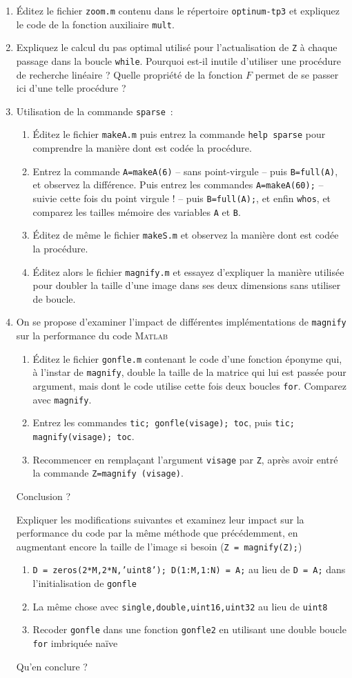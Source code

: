 \documentclass[10pt,a4paper,fleqn]{report}
\newcommand{\matlab}{\textsc{Matlab}}
\newcommand{\onit}{\begin{enumerate}}
\newcommand{\offit}{\end{enumerate}}
\renewcommand{\tt}{\texttt}
\begin{document}
\onit
\item \'Editez le fichier \tt{zoom.m} contenu dans le répertoire \tt{optinum-tp3} et expliquez le code de la fonction auxiliaire \tt{mult}.
\item Expliquez le calcul du pas optimal utilisé pour l'actualisation de \tt Z à chaque passage dans la boucle \tt{while}. Pourquoi est-il inutile d'utiliser une procédure de recherche linéaire ? Quelle propriété de la fonction $F$ permet de se passer ici d'une telle procédure ?
\item Utilisation de la commande \tt{sparse}~:
\onit
\item \'Editez le fichier \tt{makeA.m} puis entrez la commande \tt{help sparse} pour comprendre la manière dont est codée la procédure.
\item Entrez la commande \tt{A=makeA(6)} -- sans point-virgule -- puis \tt{B=full(A)}, et observez la différence. Puis entrez les commandes \tt{A=makeA(60);} -- suivie cette fois du point virgule ! -- puis \tt{B=full(A);}, et enfin \tt{whos}, et comparez les tailles mémoire des variables \tt A et \tt B.
\item \'Editez de même le fichier \tt{makeS.m} et observez la manière dont est codée la procédure.
\item \'Editez alors le fichier \tt{magnify.m} et essayez d'expliquer la manière utilisée pour doubler la taille d'une image dans ses deux dimensions sans utiliser de boucle.
\offit
\item On se propose d'examiner l'impact de différentes implémentations
  de \tt{magnify} sur la performance du code \matlab
\onit
\item \'Editez le fichier \tt{gonfle.m} contenant le code d'une fonction éponyme qui, à l'instar de \tt{magnify}, double la taille de la matrice qui lui est passée pour argument, mais dont le code utilise cette fois deux boucles \tt{for}. Comparez avec \tt{magnify}.
\item Entrez les commandes \tt{tic; gonfle(visage); toc}, puis \tt{tic; magnify(visage); toc}.
\item Recommencer en remplaçant l'argument \tt{visage} par \tt{Z}, après avoir entré la commande \tt{Z=magnify (visage)}.
\offit
Conclusion ?

Expliquer les modifications suivantes et examinez leur impact sur la
performance du code par la même méthode que précédemment, en
augmentant encore la taille de l'image si besoin (\tt{Z = magnify(Z);})
\onit
\item \tt{D = zeros(2*M,2*N,'uint8'); D(1:M,1:N) = A;} au lieu de \tt{D = A;} dans l'initialisation
  de \tt{gonfle}
\item La même chose avec \tt{single,double,uint16,uint32} au lieu de \tt{uint8}
\item Recoder \tt{gonfle} dans une fonction \tt{gonfle2} en utilisant une double
  boucle \tt{for} imbriquée naïve
  \offit
  Qu'en conclure ?
\offit
\end{document}
